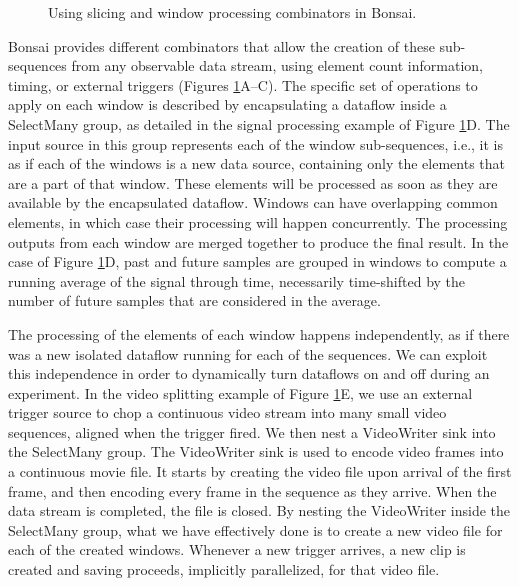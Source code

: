 \begin{figure}
\begin{center}
\scalebox{0.5}{}
\end{center}
\vspace{-5mm}
\caption{Using slicing and window processing combinators in Bonsai.}
\label{fig:bonsaiAdvanced}
\end{figure}

Bonsai provides different combinators that allow the creation of these sub-sequences from any observable data stream, using element count information, timing, or external triggers (Figures \ref{fig:bonsaiAdvanced}A–C). The specific set of operations to apply on each window is described by encapsulating a dataflow inside a SelectMany group, as detailed in the signal processing example of Figure \ref{fig:bonsaiAdvanced}D. The input source in this group represents each of the window sub-sequences, i.e., it is as if each of the windows is a new data source, containing only the elements that are a part of that window. These elements will be processed as soon as they are available by the encapsulated dataflow. Windows can have overlapping common elements, in which case their processing will happen concurrently. The processing outputs from each window are merged together to produce the final result. In the case of Figure \ref{fig:bonsaiAdvanced}D, past and future samples are grouped in windows to compute a running average of the signal through time, necessarily time-shifted by the number of future samples that are considered in the average.

The processing of the elements of each window happens independently, as if there was a new isolated dataflow running for each of the sequences. We can exploit this independence in order to dynamically turn dataflows on and off during an experiment. In the video splitting example of Figure \ref{fig:bonsaiAdvanced}E, we use an external trigger source to chop a continuous video stream into many small video sequences, aligned when the trigger fired. We then nest a VideoWriter sink into the SelectMany group. The VideoWriter sink is used to encode video frames into a continuous movie file. It starts by creating the video file upon arrival of the first frame, and then encoding every frame in the sequence as they arrive. When the data stream is completed, the file is closed. By nesting the VideoWriter inside the SelectMany group, what we have effectively done is to create a new video file for each of the created windows. Whenever a new trigger arrives, a new clip is created and saving proceeds, implicitly parallelized, for that video file.

